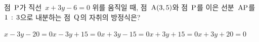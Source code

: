 점~$\mathrm{P}$가 직선~$x+3y-6=0$ 위를 움직일 때, 점~$\mathrm{A}(3{,}\mkern3mu\mathopen{}5)$와 점~$\mathrm{P}$를 이은 선분~$\mathrm{AP}$를 $1\mkern3mu :\mkern3mu 3$으로 내분하는 점~$\mathrm{Q}$의 자취의 방정식은?
\begin{choicesii}{$x-3y-20=0$}{$x-3y+15=0$}{$x+3y-15=0$}{$x+3y+15=0$}{$x+3y+20=0$}\end{choicesii}
